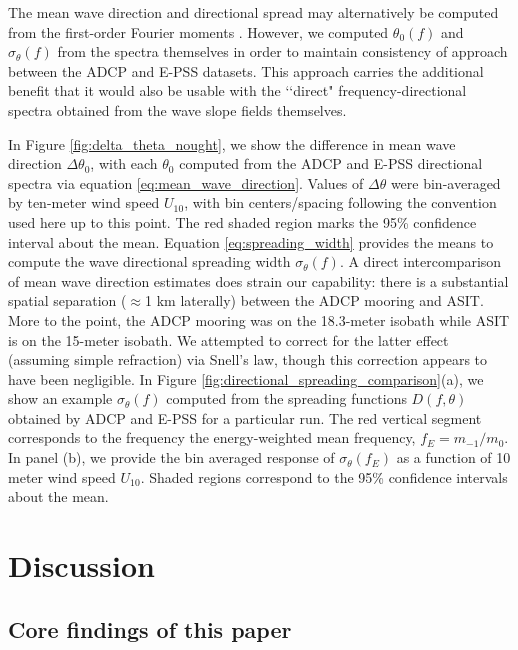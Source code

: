 \documentclass[letterpaper,journal]{IEEEtran}
\begin{document}
The mean wave direction and directional spread may alternatively be computed from the first-order Fourier moments \cite{earle_nondirectional_2003}. However, we computed $\theta_0(f)$ and $\sigma_\theta(f)$ from the spectra themselves in order to maintain consistency of approach between the ADCP and E-PSS datasets. This approach carries the additional benefit that it would also be usable with the \lq\lq direct" frequency-directional spectra obtained from the wave slope fields themselves.

In Figure \ref{fig:delta_theta_nought}, we show the difference in mean wave direction $\Delta\theta_0$, with each $\theta_0$ computed from the ADCP and E-PSS directional spectra via equation \ref{eq:mean_wave_direction}. Values of $\Delta\theta$ were bin-averaged by ten-meter wind speed $U_{10}$, with bin centers/spacing following the convention used here up to this point. The red shaded region marks the 95\% confidence interval about the mean. Equation \ref{eq:spreading_width} provides the means to compute the wave directional spreading width $\sigma_\theta(f)$. A direct intercomparison of mean wave direction estimates does strain our capability: there is a substantial spatial separation ($\approx$1 km laterally) between the ADCP mooring and ASIT. More to the point, the ADCP mooring was on the 18.3-meter isobath while ASIT is on the 15-meter isobath. We attempted to correct for the latter effect (assuming simple refraction) via Snell's law, though this correction appears to have been negligible. In Figure \ref{fig:directional_spreading_comparison}(a), we show an example $\sigma_\theta(f)$ computed from the spreading functions $D(f,\theta)$ obtained by ADCP and E-PSS for a particular run. The red vertical segment corresponds to the frequency the energy-weighted mean frequency, $f_E=m_{-1}/m_{0}$. In panel (b), we provide the bin averaged response of $\sigma_\theta(f_E)$ as a function of 10 meter wind speed $U_{10}$. Shaded regions correspond to the 95\% confidence intervals about the mean.

\newpage


\section{Discussion}
\label{sec:discussion}

\subsection{Core findings of this paper}
\end{document}
